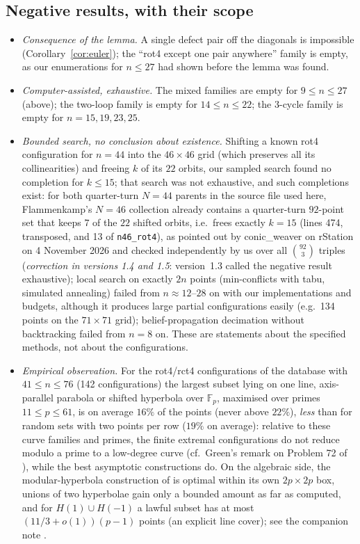 \documentclass[11pt]{article}
\theoremstyle{remark}
\begin{document}
\subsection{Negative results, with their scope}
\begin{itemize}
\item \emph{Consequence of the lemma.}  A single defect pair off the diagonals is impossible (Corollary~\ref{cor:euler}); the
``rot4 except one pair anywhere'' family is empty, as our enumerations for $n\le 27$ had shown before the lemma was found.
\item \emph{Computer-assisted, exhaustive.}  The mixed families are empty for $9\le n\le27$ (above); the two-loop family is
empty for $14\le n\le22$; the $3$-cycle family is empty for $n=15,19,23,25$.
\item \emph{Bounded search, no conclusion about existence.}  Shifting a known rot4 configuration for $n=44$ into the
$46\times46$ grid (which preserves all its collinearities) and freeing $k$ of its $22$ orbits, our sampled search found no completion for
$k\le15$; that search was not exhaustive, and such completions exist: for both quarter-turn $N=44$
parents in the source file used here, Flammenkamp's $N=46$ collection already contains a quarter-turn
$92$-point set that keeps $7$ of the $22$ shifted orbits, i.e.\ frees exactly $k=15$ (lines 474, transposed,
and 13 of \texttt{n46\_rot4}), as pointed out by conic\_weaver on rStation on 4 November 2026 and checked
independently by us over all $\binom{92}{3}$ triples (\emph{correction in versions 1.4 and 1.5}: version~1.3
called the negative result exhaustive); local search on exactly $2n$ points (min-conflicts with tabu, simulated annealing) failed
from $n\approx12$--$28$ on with our implementations and budgets, although it produces large partial configurations easily
(e.g.\ 134 points on the $71\times71$ grid); belief-propagation decimation without backtracking failed from $n=8$ on.  These
are statements about the specified methods, not about the configurations.
\item \emph{Empirical observation.}  For the rot4/rct4 configurations of the database with $41\le n\le76$ (142
configurations) the largest subset lying on one line, axis-parallel parabola or shifted hyperbola over $\mathbb F_p$,
maximised over primes $11\le p\le61$, is on average $16\%$ of the points (never above $22\%$), \emph{less} than for random
sets with two points per row ($19\%$ on average): relative to these curve families and primes, the finite extremal
configurations do not reduce modulo a prime to a low-degree curve (cf.\ Green's remark on Problem 72 of \cite{Green}), while
the best asymptotic constructions do.  On the algebraic side, the modular-hyperbola construction of \cite{HJSW75} is optimal
within its own $2p\times2p$ box, unions of two hyperbolae gain only a bounded amount as far as computed, and for $H(1)\cup H(-1)$ a lawful
subset has at most $(11/3+o(1))(p-1)$ points (an explicit line cover); see the companion note \cite{Companion}.
\end{itemize}
\end{document}
